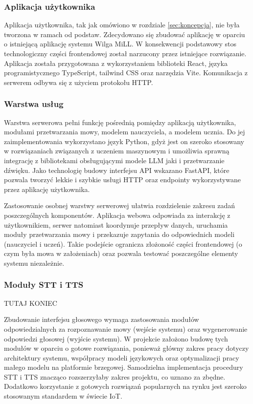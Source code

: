\subsubsection{Aplikacja użytkownika}

Aplikacja użytkownika, tak jak omówiono w rozdziale \ref{sec:koncepcja}, nie była tworzona w ramach od podstaw. Zdecydowano się zbudować aplikację w oparciu o istniejącą aplikację systemu Wilga MiLL. W konsekwencji podstawowy stos technologiczny części frontendowej został narzucony przez istniejące rozwiązanie. Aplikacja została przygotowana z wykorzystaniem biblioteki React, języka programistycznego TypeScript, tailwind CSS oraz narzędzia Vite. Komunikacja z serwerem odbywa się z użyciem protokołu HTTP. 

\subsubsection{Warstwa usług}

Warstwa serwerowa pełni funkcję pośrednią pomiędzy aplikacją użytkownika, modułami przetwarzania mowy, modelem nauczyciela, a modelem ucznia. Do jej zaimplementowania wykorzystano język Python, gdyż jest on szeroko stosowany w rozwiązaniach związanych z uczeniem maszynowym i umożliwia sprawną integrację z bibliotekami obsługującymi modele LLM jaki i przetwarzanie dźwięku. Jako technologię budowy interfejsu API wskazano FastAPI, które pozwala tworzyć lekkie i szybkie usługi HTTP oraz endpointy wykorzystywane przez aplikację użytkownika.

Zastosowanie osobnej warstwy serwerowej ułatwia rozdzielenie zakresu zadań poszczególnych komponentów. Aplikacja webowa odpowiada za interakcję z użytkownikiem, serwer natomiast koordynuje przepływ danych, uruchamia moduły przetwarzania mowy i przekazuje zapytania do odpowiednich modeli (nauczyciel i uczeń). Takie podejście ogranicza złożoność części frontendowej (o czym była mowa w założeniach) oraz pozwala testować poszczególne elementy systemu niezależnie.

\subsubsection{Moduły STT i TTS}TUTAJ KONIEC

Zbudowanie interfejsu głosowego wymaga zastosowania modułów odpowiedzialnych za rozpoznawanie mowy (wejście systemu) oraz wygenerowanie odpowiedzi głosowej (wyjście systemu). W projekcie założono budowę tych modułów w oparciu o gotowe rozwiązania, ponieważ główny zakres pracy dotyczy architektury systemu, współpracy modeli językowych oraz optymalizacji pracy małego modelu na platformie brzegowej. Samodzielna implementacja procedury STT i TTS znacząco rozszerzyłaby zakres projektu, co uznano za zbędne. Dodatkowo korzystanie z gotowych rozwiązań popularnych na rynku jest szeroko stosowanym standardem w świecie IoT.

